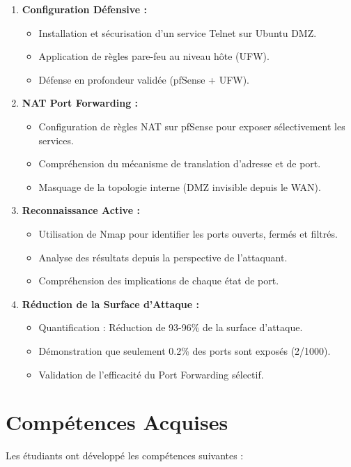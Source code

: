\documentclass[12pt,a4paper,openany]{report}
\begin{document}
	\begin{enumerate}
		\item \textbf{Configuration Défensive :}
		\begin{itemize}
			\item Installation et sécurisation d'un service Telnet sur Ubuntu DMZ.
			\item Application de règles pare-feu au niveau hôte (UFW).
			\item Défense en profondeur validée (pfSense + UFW).
		\end{itemize}
		
		\item \textbf{NAT Port Forwarding :}
		\begin{itemize}
			\item Configuration de règles NAT sur pfSense pour exposer sélectivement les services.
			\item Compréhension du mécanisme de translation d'adresse et de port.
			\item Masquage de la topologie interne (DMZ invisible depuis le WAN).
		\end{itemize}
		
		\item \textbf{Reconnaissance Active :}
		\begin{itemize}
			\item Utilisation de Nmap pour identifier les ports ouverts, fermés et filtrés.
			\item Analyse des résultats depuis la perspective de l'attaquant.
			\item Compréhension des implications de chaque état de port.
		\end{itemize}
		
		\item \textbf{Réduction de la Surface d'Attaque :}
		\begin{itemize}
			\item Quantification : Réduction de 93-96\% de la surface d'attaque.
			\item Démonstration que seulement 0.2\% des ports sont exposés (2/1000).
			\item Validation de l'efficacité du Port Forwarding sélectif.
		\end{itemize}
	\end{enumerate}
	
	\section{Compétences Acquises}
	Les étudiants ont développé les compétences suivantes :
	
\end{document}

